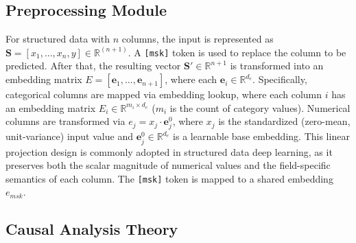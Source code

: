 \documentclass[sigconf, nonacm]{acmart}
\newcommand{\rlend}[1]{{\color{black}#1}}
\newcommand{\syadd}[1]{{\color{black}#1}}
\newcommand{\syfix}[1]{{\color{black}#1}}
\begin{document}
\subsection{Preprocessing Module}
\rlend{
For structured data with $n$ columns, the input is represented as $\mathbf{S} = [x_1, \ldots, x_n, y] \in \mathbb{R}^{(n+1)}$. 
\syfix{
A \texttt{[msk]} token is used to replace the column to be predicted.}
After that, the resulting vector $\mathbf{S}' \in \mathbb{R}^{n+1}$ is transformed into an embedding matrix $E = [\mathbf{e}_1, \dots, \mathbf{e}_{n+1}]$, where each $\mathbf{e}_i \in \mathbb{R}^{d_e}$. 
Specifically, categorical columns are mapped via embedding lookup, where each column $i$ has an embedding matrix $E_i \in \mathbb{R}^{m_i \times d_e}$ ($m_i$ is the count of category values). 
Numerical columns are transformed via $e_j = x_j \cdot \mathbf{e}^0_j$, where $x_j$ is the standardized \syadd{(zero-mean, unit-variance)} input value and $\mathbf{e}^0_j \in \mathbb{R}^{d_e}$ is a learnable base embedding. 
\syadd{This linear projection design is commonly adopted in structured data deep learning\cite{r:armnet, r:autoint, r:ft-transformer}, as it preserves both the scalar magnitude of numerical values and the field-specific semantics of each column.
}
\syadd{The \texttt{[msk]} token is mapped to a shared embedding $e_{msk}$.}
}

\subsection{Causal Analysis Theory}\label{sec:causal_theory}
\end{document}
